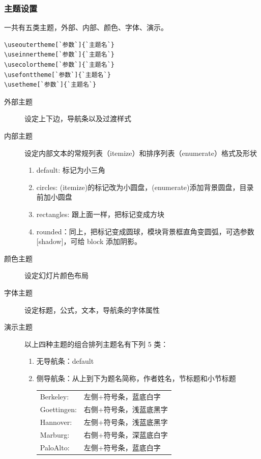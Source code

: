 \subsubsection{主题设置}



一共有五类主题，外部、内部、颜色、字体、演示。
\begin{lstlisting}[language={[LaTeX]TeX}]
\useoutertheme[`参数`]{`主题名`}
\useinnertheme[`参数`]{`主题名`}
\usecolortheme[`参数`]{`主题名`}
\usefonttheme[`参数`]{`主题名`}
\usetheme[`参数`]{`主题名`}
\end{lstlisting}

\begin{description}
  \item[外部主题] 设定上下边，导航条以及过渡样式

  \item[内部主题] 设定内部文本的常规列表（itemize）和排序列表（enumerate）格式及形状
  \begin{enumerate}
    \item default: 标记为小三角
    \item circles: (itemize)的标记改为小圆盘，(enumerate)添加背景圆盘，目录前加小圆盘
    \item rectangles: 跟上面一样，把标记变成方块
    \item rounded：同上，把标记变成圆球，模块背景框直角变圆弧，可选参数[shadow]，可给 block 添加阴影。
  \end{enumerate}

  \item[颜色主题] 设定幻灯片颜色布局
  \item[字体主题] 设定标题，公式，文本，导航条的字体属性

  \item[演示主题] 以上四种主题的组合排列主题名有下列 5 类：
\begin{enumerate}
  \item 无导航条：default
  \item 侧导航条：从上到下为题名简称，作者姓名，节标题和小节标题

  \begin{tabular}{ll}
    Berkeley: & 左侧+符号条，蓝底白字 \\
    Goettingen: & 右侧+符号条，浅蓝底黑字 \\
    Hannover: & 左侧+符号条，浅蓝底黑字 \\
    Marburg: &  右侧+符号条，深蓝底白字\\
    PaloAlto: & 左侧+符号条，蓝底白字 \\
  \end{tabular}


\end{enumerate}
\end{description}
